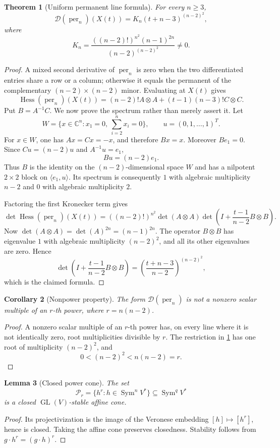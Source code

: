 \documentclass[11pt]{article}
\newtheorem{theorem}{Theorem}[section]
\newtheorem{lemma}[theorem]{Lemma}
\newtheorem{corollary}[theorem]{Corollary}
\theoremstyle{remark}
\DeclareMathOperator{\Hess}{Hess}
\DeclareMathOperator{\per}{per}
\DeclareMathOperator{\Sym}{Sym}
\DeclareMathOperator{\GL}{GL}
\newcommand{\C}{\mathbb C}
\newcommand{\Dcal}{\mathcal D}
\begin{document}
\begin{theorem}[Uniform permanent line formula]\label{thm:line}
For every $n\geq3$,
\[
 \Dcal(\per_n)(X(t))=K_n(t+n-3)^{(n-2)^2},
\]
where
\[
 K_n=\frac{((n-2)!)^{n^2}(n-1)^{2n}}{(n-2)^{(n-2)^2}}\neq0.
\]
\end{theorem}
\begin{proof}
A mixed second derivative of $\per_n$ is zero when the two differentiated entries share a row or a column; otherwise it equals the permanent of the complementary $(n-2)\times(n-2)$ minor.  Evaluating at $X(t)$ gives
\[
 \Hess(\per_n)(X(t))
 =(n-2)!A\otimes A+(t-1)(n-3)!C\otimes C.
\]
Put $B=A^{-1}C$.  We now prove the spectrum rather than merely assert it.  Let
\[
 W=\{x\in\C^n:x_1=0,\ \sum_{i=2}^n x_i=0\},
 \qquad u=(0,1,\ldots,1)^T.
\]
For $x\in W$, one has $Ax=Cx=-x$, and therefore $Bx=x$.  Moreover $Be_1=0$.  Since $Cu=(n-2)u$ and $A^{-1}u=e_1$,
\[
 Bu=(n-2)e_1.
\]
Thus $B$ is the identity on the $(n-2)$-dimensional space $W$ and has a nilpotent $2\times2$ block on $\langle e_1,u\rangle$.  Its spectrum is consequently $1$ with algebraic multiplicity $n-2$ and $0$ with algebraic multiplicity $2$.

Factoring the first Kronecker term gives
\[
 \det\Hess(\per_n)(X(t))
 =((n-2)!)^{n^2}\det(A\otimes A)
 \det\left(I+\frac{t-1}{n-2}B\otimes B\right).
\]
Now $\det(A\otimes A)=\det(A)^{2n}=(n-1)^{2n}$.  The operator $B\otimes B$ has eigenvalue $1$ with algebraic multiplicity $(n-2)^2$, and all its other eigenvalues are zero.  Hence
\[
 \det\left(I+\frac{t-1}{n-2}B\otimes B\right)
 =\left(\frac{t+n-3}{n-2}\right)^{(n-2)^2},
\]
which is the claimed formula.
\end{proof}

\begin{corollary}[Nonpower property]\label{cor:nonpower}
The form $\Dcal(\per_n)$ is not a nonzero scalar multiple of an $r$-th power, where $r=n(n-2)$.
\end{corollary}
\begin{proof}
A nonzero scalar multiple of an $r$-th power has, on every line where it is not identically zero, root multiplicities divisible by $r$.  The restriction in \cref{thm:line} has one root of multiplicity $(n-2)^2$, and
\[
 0<(n-2)^2<n(n-2)=r.
\]
\end{proof}

\begin{lemma}[Closed power cone]\label{lem:powercone}
The set
\[
 \mathcal P_r=\{h^r:h\in\Sym^nV^*\}\subseteq\Sym^qV^*
\]
is a closed $\GL(V)$-stable affine cone.
\end{lemma}
\begin{proof}
Its projectivization is the image of the Veronese embedding $[h]\mapsto[h^r]$, hence is closed.  Taking the affine cone preserves closedness.  Stability follows from $g\cdot h^r=(g\cdot h)^r$.
\end{proof}
\end{document}
